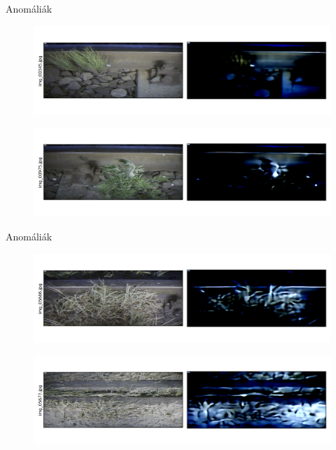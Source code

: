 \documentclass[aspectratio=169]{beamer}
\begin{document}
\begin{frame}{Anomáliák}
    \begin{figure}
        \centering
        \includegraphics[width=\textwidth,trim={0 1cm 0 1cm},clip]{./results/vgg19_vgg19_MAV/20230510_172958_predict_0.png}
    \end{figure}
    \begin{figure}
        \centering
        \includegraphics[width=\textwidth,trim={0 1cm 0 1cm},clip]{./results/vgg19_vgg19_MAV/20230510_172958_predict_1.png}
    \end{figure}
\end{frame}

\begin{frame}{Anomáliák}
    \begin{figure}
        \centering
        \includegraphics[width=\textwidth,trim={0 1cm 0 1cm},clip]{./results/vgg19_vgg19_MAV/20230510_172958_predict_2.png}
    \end{figure}
    \begin{figure}
        \centering
        \includegraphics[width=\textwidth,trim={0 1cm 0 1cm},clip]{./results/vgg19_vgg19_MAV/20230510_172958_predict_3.png}
    \end{figure}
\end{frame}
\end{document}
